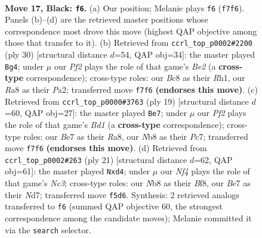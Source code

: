 \documentclass[11pt]{article}
\begin{document}
\clearpage

\begin{figure}[p]\centering
\begin{subfigure}{0.46\textwidth}\centering
\resizebox{\linewidth}{!}{%
\newchessgame
\chessboard[
  setfen={rnb1k2r/pp2bppp/4p3/3pPn2/5P1P/3B2P1/P2NN3/R1B1K2R b KQ - 0 17},
  showmover=false,
  pgfstyle=straightmove, color=movearrow, markmove={f7-f6}
]}
\caption{}
\end{subfigure}\hfill
\begin{subfigure}{0.46\textwidth}\centering
\resizebox{\linewidth}{!}{%
\newchessgame
\chessboard[
  setfen={rnb1k2r/pp2bppp/2p5/3pPn2/5P2/1N2N3/PB1PB1PP/R3K2R w KQkq - 10 16},
  showmover=false,
  pgfstyle=straightmove, color=movearrow, markmove={e2-g4}
]}
\caption{}
\end{subfigure}
\\[4pt]
\begin{subfigure}{0.46\textwidth}\centering
\resizebox{\linewidth}{!}{%
\newchessgame
\chessboard[
  setfen={r2bk2r/ppp2ppp/4bn2/4p1B1/P3P3/2N2P2/1PP3PP/R3KB1R b KQkq - 0 10},
  showmover=false,
  pgfstyle=straightmove, color=movearrow, markmove={d8-e7}
]}
\caption{}
\end{subfigure}\hfill
\begin{subfigure}{0.46\textwidth}\centering
\resizebox{\linewidth}{!}{%
\newchessgame
\chessboard[
  setfen={r3kb1r/pppn1pp1/2n1b2p/4P3/3N3P/P3P3/1P1N1PP1/R1B1KB1R b KQkq - 4 11},
  showmover=false,
  pgfstyle=straightmove, color=movearrow, markmove={c6-d4}
]}
\caption{}
\end{subfigure}
\caption{\textbf{Move 17, Black: \texttt{f6}.} (a) Our position; Melanie plays \texttt{f6} (\texttt{f7f6}). Panels (b)--(d) are the retrieved master positions whose correspondence most drove this move (highest QAP objective among those that transfer to it). (b) Retrieved from \texttt{ccrl\_top\_p0002\#2200} (ply 30) [structural distance $d$=54, QAP obj=34]: the master played \texttt{Bg4}; under $\mu$ our \emph{Pf2} plays the role of that game's \emph{Be2} (a \textbf{cross-type} correspondence); cross-type roles: our \emph{B}c8 as their \emph{R}h1, our \emph{R}a8 as their \emph{P}a2; transferred move \texttt{f7f6} \textbf{(endorses this move)}. (c) Retrieved from \texttt{ccrl\_top\_p0000\#3763} (ply 19) [structural distance $d$=60, QAP obj=27]: the master played \texttt{Be7}; under $\mu$ our \emph{Pf2} plays the role of that game's \emph{Bd1} (a \textbf{cross-type} correspondence); cross-type roles: our \emph{B}e7 as their \emph{R}a8, our \emph{N}b8 as their \emph{P}c7; transferred move \texttt{f7f6} \textbf{(endorses this move)}. (d) Retrieved from \texttt{ccrl\_top\_p0002\#263} (ply 21) [structural distance $d$=62, QAP obj=61]: the master played \texttt{Nxd4}; under $\mu$ our \emph{Nf4} plays the role of that game's \emph{Nc3}; cross-type roles: our \emph{N}b8 as their \emph{B}f8, our \emph{B}e7 as their \emph{N}d7; transferred move \texttt{f5d6}. Synthesis: 2 retrieved analogs transferred to \texttt{f6} (summed QAP objective 60, the strongest correspondence among the candidate moves); Melanie committed it via the \texttt{search} selector.}
\label{fig:thought-m33}
\end{figure}
\end{document}
